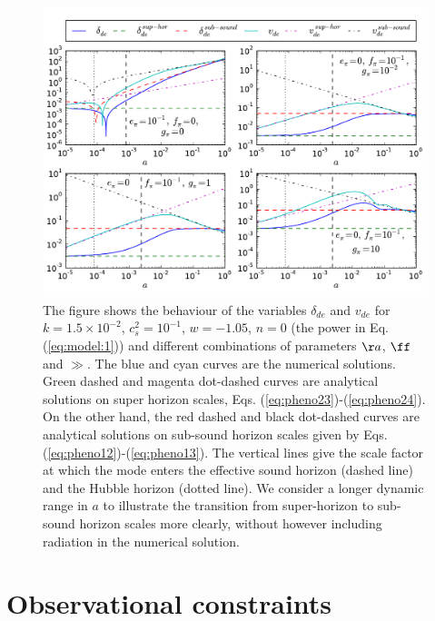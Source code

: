 \begin{figure}[tb]
\centering
\includegraphics[scale=.76]{figures/chapter-ade/comparison.pdf} 
\caption{The figure shows the behaviour of the variables $ \delta_{de} $ and $ v_{de} $ for $k=1.5\times 10^{-2}$, $c_s^2 = 10^{-1}$, $w=-1.05$, $ n=0 $ (the power in Eq. (\ref{eq:model:1})) and different combinations of parameters $\aa$, $\ff$ and $\gg$. The blue and cyan curves are the numerical solutions. Green dashed and magenta dot-dashed curves are analytical solutions on super horizon scales, Eqs. (\ref{eq:pheno23})-(\ref{eq:pheno24}). On the other hand, the red dashed and black dot-dashed curves are analytical solutions on sub-sound horizon scales given by Eqs. (\ref{eq:pheno12})-(\ref{eq:pheno13}). The vertical lines give the scale factor at which the mode enters the effective sound horizon (dashed line) and the Hubble horizon (dotted line). We consider  a longer dynamic range in $a$ to illustrate the transition from super-horizon to sub-sound horizon scales more clearly, without however including radiation in the numerical solution.}
\label{fig:comparison}
\end{figure}

\section{Observational constraints}
\label{chapter-ade:constraints}

